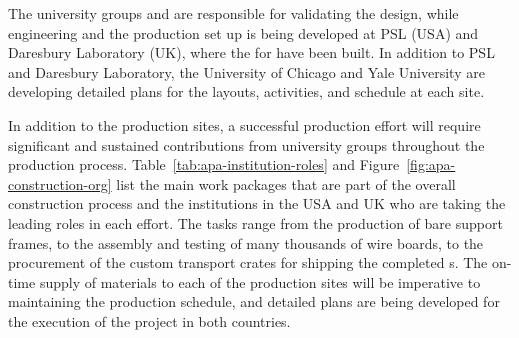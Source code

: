 



The university groups and  are responsible for validating  the design, while engineering and the production set up is being developed at PSL %
(USA) and Daresbury Laboratory (UK), where the  for  have been built. 
In addition to PSL and Daresbury Laboratory, the University of Chicago and Yale University are developing detailed plans for the layouts, activities, and schedule at each site. 

In addition to the  production sites, a successful production effort will require significant and sustained contributions from university groups throughout the production process.  Table~\ref{tab:apa-institution-roles} and Figure~\ref{fig:apa-construction-org} list the main work packages that are part of the overall  construction process and the institutions in the USA and UK who are taking the leading roles in each effort.  The tasks range from the production of bare support frames, to the assembly and testing of many thousands of wire boards, to the procurement of the custom transport crates for shipping the completed s.  The on-time supply of materials to each of the  production sites will be imperative to maintaining the production schedule, and detailed plans are being developed for the execution of the project in both countries. 

